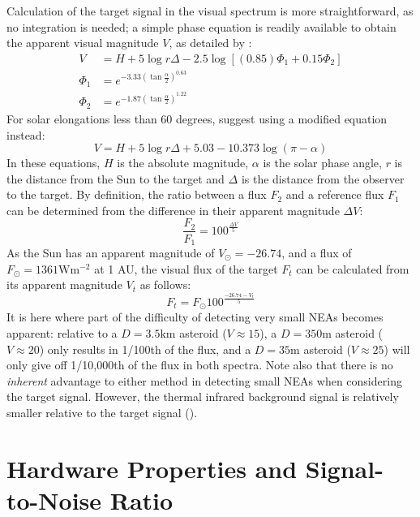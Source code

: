 Calculation of the target signal in the visual spectrum is more straightforward, as no integration is needed; a simple phase equation is readily available to obtain the apparent visual magnitude $V$, as detailed by \cite{2003NEOSDT}:
\begin{align}
 V &= H + 5 \log r \Delta - 2.5 \log \left[ (0.85) \Phi_1 + 0.15 \Phi_2 \right] \\
 \Phi_1 &= e^{-3.33\left(\tan \frac{\alpha}{2} \right)^{0.63}} \\
 \Phi_2 &= e^{-1.87\left(\tan \frac{\alpha}{2} \right)^{1.22}}
\end{align}
For solar elongations less than 60 degrees, \cite{2003NEOSDT} suggest using a modified equation instead:
\begin{equation}
 V = H + 5 \log r \Delta + 5.03 - 10.373 \log (\pi - \alpha)
\end{equation}
In these equations, $H$ is the absolute magnitude, $\alpha$ is the solar phase angle, $r$ is the distance from the Sun to the target and $\Delta$ is the distance from the observer to the target. By definition, the ratio between a flux $F_2$ and a reference flux $F_1$ can be determined from the difference in their apparent magnitude $\Delta V$:
\begin{equation}
 \frac{F_2}{F_1} = 100^{\frac{\Delta V}{5}}
\end{equation}
As the Sun has an apparent magnitude of $V_\odot = -26.74$, and a flux of $F_\odot = 1361 \mathrm{W}\mathrm{m}^{-2}$ at 1 AU, the visual flux of the target $F_t$ can be calculated from its apparent magnitude $V_t$ as follows:
\begin{equation}
 F_t = F_\odot 100^{\frac{-26.74 - V_t}{5}}
\end{equation}
It is here where part of the difficulty of detecting very small NEAs becomes apparent: relative to a $D = 3.5 \mathrm{km}$ asteroid ($V \approx 15$), a $D = 350 \mathrm{m}$ asteroid ($V \approx 20$) only results in 1/100th of the flux, and a $D = 35 \mathrm{m}$ asteroid ($V \approx 25$) will only give off 1/10,000th of the flux in both spectra. Note also that there is no \textit{inherent} advantage to either method in detecting small NEAs when considering the target signal. However, the thermal infrared background signal is relatively smaller relative to the target signal (\cite{2003NEOSDT}).

\section{Hardware Properties and Signal-to-Noise Ratio}
\label{sec:modelling_hardware_SNR}


